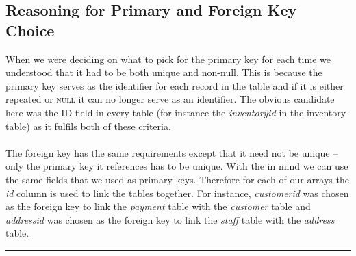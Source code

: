 \documentclass[openany]{article}
\begin{document}
\subsection{Reasoning for Primary and Foreign Key Choice}
	When we were deciding on what to pick for the primary key for each time we understood that it had to be both unique and non-null. 
	This is because the primary key serves as the identifier for each record in the table and if it is either repeated or \textsc{null} it can no longer serve as an identifier. 
	The obvious candidate here was  the ID field in every table (for instance the \emph{inventory\textunderscore id} in the inventory table) as it fulfils both of these criteria.
	\\\\
	The foreign key has the same requirements except that it need not be unique – only the primary key it references has to be unique. 
	With the in mind we can use the same fields that we used as primary keys. Therefore for each of our arrays the \emph{id} column is used to link the tables together. 
	For instance, \emph{customer\textunderscore id} was chosen as the foreign key to link the \emph{payment} table with the \emph{customer} table and \emph{address\textunderscore id} 
	was chosen as the foreign key to link the \emph{staff} table with the \emph{address} table.
	\\
	\rule{\textwidth}{0.4pt}
\end{document}
